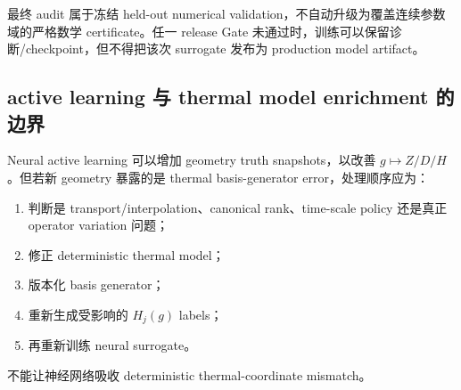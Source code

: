 最终 audit 属于冻结 held-out numerical validation，不自动升级为覆盖连续参数域的严格数学 certificate。任一 release Gate 未通过时，训练可以保留诊断/checkpoint，但不得把该次 surrogate 发布为 production model artifact。

\subsection{active learning 与 thermal model enrichment 的边界}
Neural active learning 可以增加 geometry truth snapshots，以改善 $g\mapsto Z/D/H$。但若新 geometry 暴露的是 thermal basis-generator error，处理顺序应为：
\begin{enumerate}
  \item 判断是 transport/interpolation、canonical rank、time-scale policy 还是真正 operator variation 问题；
  \item 修正 deterministic thermal model；
  \item 版本化 basis generator；
  \item 重新生成受影响的 $H_j(g)$ labels；
  \item 再重新训练 neural surrogate。
\end{enumerate}
不能让神经网络吸收 deterministic thermal-coordinate mismatch。
